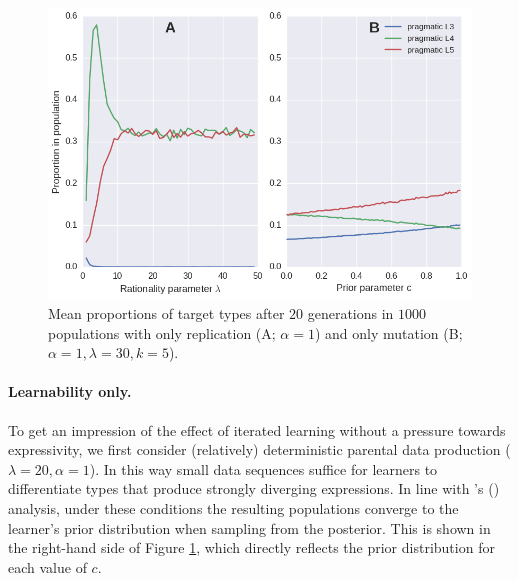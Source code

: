 \documentclass[a4paper]{article}
\newcommand{\citeposs}[2][]{\citeauthor{#2}'s (\citeyear[#1]{#2})}
\begin{document}
\begin{figure}
\centering
\includegraphics[scale=.5]{./only-R-or-M}
\caption{Mean proportions of target types after $20$ generations in $1000$ populations with only replication (A; $\alpha = 1$) and only mutation (B; $\alpha =1, \lambda = 30, k = 5$).}
\label{fig:either-R-or-M}
\end{figure}

\paragraph{Learnability only.} To get an impression of the effect of iterated learning without a pressure towards expressivity, we first consider (relatively) deterministic parental data production ($\lambda = 20, \alpha = 1$). In this way small data sequences suffice for learners to differentiate types that produce strongly diverging expressions. In line with \citeposs{griffiths+kalish:2007} analysis, under these conditions the resulting populations converge to the learner's prior distribution when sampling from the posterior. This is shown in the right-hand side of Figure \ref{fig:either-R-or-M}, which directly reflects the prior distribution for each value of $c$.
\end{document}
